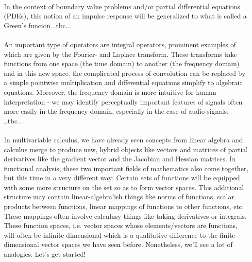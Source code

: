 \paragraph{}
In the context of boundary value problems and/or partial differential equations (PDEs), this notion of an impulse response will be generalized to what is called a Green's funcion...tbc...

\paragraph{}
An important type of operators are integral operators, prominent examples of which are given by the Fourier- and Laplace transform. These transforms take functions from one space (the time domain) to another (the frequency domain) and in this new space, the complicated process of convolution can be replaced by a simple pointwise multiplication and differential equations simplify to algebraic equations. Moreover, the frequency domain is more intuitive for human interpretation - we may identify perceptually important features of signals often more easily in the frequency domain, especially in the case of audio signals.
..tbc...

\paragraph{}
In multivariable calculus, we have already seen concepts from linear algebra and calculus merge to produce new, hybrid objects like vectors and matrices of partial derivatives like the gradient vector and the Jacobian and Hessian matrices. In functional analysis, these two important fields of mathematics also come together, but this time in a very different way: Certain sets of functions will be equipped with some more structure on the set so as to form vector spaces. This additional structure may contain linear-algebra'ish things like norms of functions, scalar products between functions, linear mappings of functions to other functions, etc. These mappings often involve calculusy things like taking derivatives or integrals. These function spaces, i.e. vector spaces whose elements/vectors are functions, will often be infinite-dimensional which is a qualitative difference to the finite-dimensional vector spaces we have seen before. Nonetheless, we'll see a lot of analogies. Let's get started!

\begin{comment}


-integral transforms (fourier- and laplace trafo)
-greens-functions
-calculus of variations
-operators: eigenvalues, eigenfunctions


\end{comment}